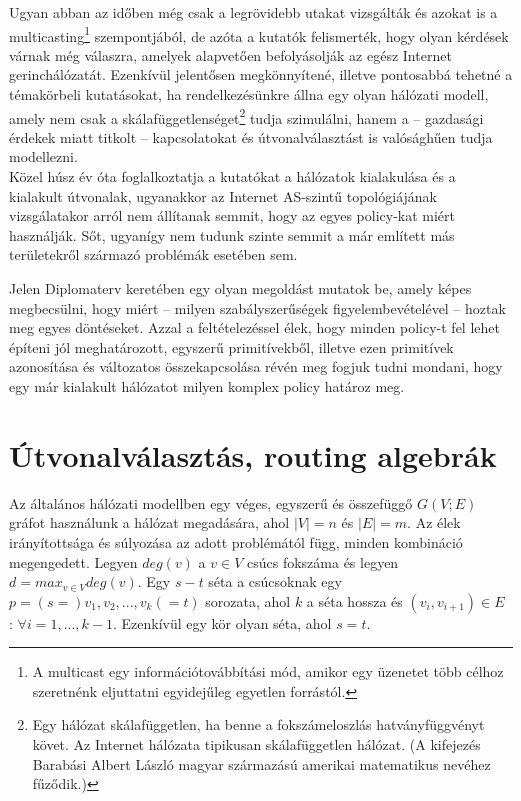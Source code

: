   Ugyan abban az időben még csak a legrövidebb utakat vizsgálták és azokat is a multicasting\footnote{A multicast egy információtovábbítási mód, amikor egy üzenetet több célhoz szeretnénk eljuttatni egyidejűleg egyetlen forrástól.} szempontjából, de azóta a kutatók felismerték, hogy olyan kérdések várnak még válaszra, amelyek alapvetően befolyásolják az egész Internet gerinchálózatát. Ezenkívül jelentősen megkönnyítené, illetve pontosabbá tehetné a témakörbeli kutatásokat, ha rendelkezésünkre állna egy olyan hálózati modell, amely nem csak a skálafüggetlenséget\footnote{Egy hálózat skálafüggetlen, ha benne a fokszámeloszlás hatványfüggvényt követ. Az Internet hálózata tipikusan skálafüggetlen hálózat. (A kifejezés Barabási Albert László magyar származású amerikai matematikus nevéhez fűződik.)} tudja szimulálni, hanem a -- gazdasági érdekek miatt titkolt -- kapcsolatokat és útvonalválasztást is valósághűen tudja modellezni.\\

  Közel húsz év óta foglalkoztatja a kutatókat a hálózatok kialakulása és a kialakult útvonalak, ugyanakkor az Internet AS-szintű topológiájának vizsgálatakor arról nem állítanak semmit, hogy az egyes policy-kat miért használják. Sőt, ugyanígy nem tudunk szinte semmit a már említett más területekről származó problémák esetében sem.

  Jelen Diplomaterv keretében egy olyan megoldást mutatok be, amely képes megbecsülni, hogy miért -- milyen szabályszerűségek figyelembevételével -- hoztak meg egyes döntéseket. Azzal a feltételezéssel élek, hogy minden policy-t fel lehet építeni jól meghatározott, egyszerű primitívekből, illetve ezen primitívek azonosítása és változatos összekapcsolása révén meg fogjuk tudni mondani, hogy egy már kialakult hálózatot milyen komplex policy határoz meg.\\

  \section{Útvonalválasztás, routing algebrák}\label{section_routingalgebrak}

  Az általános hálózati modellben egy véges, egyszerű és összefüggő $G(V;E)$ gráfot használunk a hálózat megadására, ahol $|V| = n$ és $|E| = m$. Az élek irányítottsága és súlyozása az adott problémától függ, minden kombináció megengedett. Legyen $deg(v)$ a $v \in V$ csúcs fokszáma és legyen $d = max_{v \in V} deg(v)$. Egy $s-t$ séta a csúcsoknak egy $p = (s =)v_1, v_2, ..., v_k(= t)$ sorozata, ahol $k$ a séta hossza és $(v_i, v_{i+1}) \in E$ : $\forall i = 1,...,k-1$. Ezenkívül egy kör olyan séta, ahol $s = t$.

